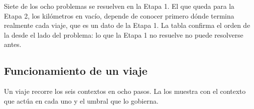 Siete de los ocho problemas se resuelven en la Etapa 1. El que queda para la Etapa 2, los kilómetros en
vacío, depende de conocer primero dónde termina realmente cada viaje, que es un dato de la Etapa 1. La
tabla confirma el orden de la  desde el lado del problema: lo que la Etapa 1 no resuelve
no puede resolverse antes.

\subsection{Funcionamiento de un viaje}\label{sec:3-viaje}

Un viaje recorre los seis contextos en ocho pasos. La  los muestra con el contexto que
actúa en cada uno y el umbral que lo gobierna.

